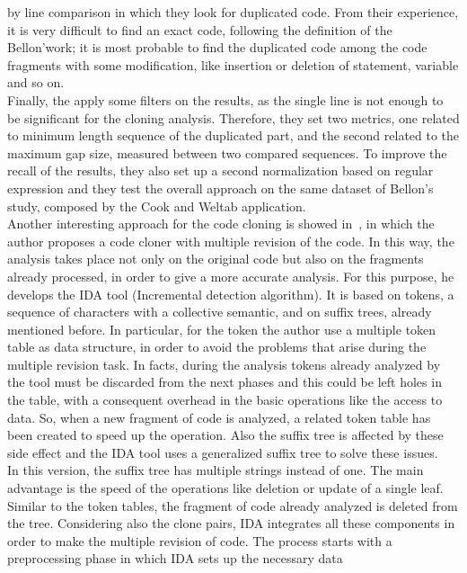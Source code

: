 by line comparison in which they look for duplicated code. From their 
experience, it is very difficult to find an exact code, following the 
definition of the Bellon'work; it is most probable to find the duplicated code 
among the code fragments with some modification, like insertion or deletion of 
statement, variable and so on. \\
Finally, the apply some filters on the results, as the single line is not 
enough to be significant for the cloning analysis. Therefore, they set two 
metrics, one related to minimum length sequence of the duplicated part, and the 
second related to the maximum gap size, measured between two compared 
sequences. To improve the recall of the results, they also set up a second 
normalization based on regular expression and they test the overall approach on 
the same dataset of Bellon's study, composed by the Cook and Weltab 
application. 
\\
Another interesting approach for the code cloning is showed 
in~\cite{nils_gode_incremental_2008}, in which the author proposes a code 
cloner with multiple revision of the code. In this way, the analysis takes 
place not only on the original code but also on the fragments already 
processed, in order to give a more accurate analysis. For this purpose, he 
develops the IDA tool (Incremental detection algorithm). It is based on tokens, 
a sequence of characters with a collective semantic, and on suffix trees, 
already mentioned before. In particular, for the token the author use a 
multiple token table as data structure, in order to avoid the problems that 
arise during the multiple revision task. In facts, during the analysis tokens 
already analyzed by the tool must be discarded from the next phases and this 
could be left holes in the table, with a consequent overhead in the basic 
operations like the access to data. So, when a new fragment of code is 
analyzed, a related token table has been created to speed up the operation. 
Also the suffix tree is affected by these side effect and the IDA tool uses a 
generalized suffix tree to solve these issues. \\
\newpage
In this version, the suffix tree has multiple strings instead of one. The main 
advantage is the speed of the operations like deletion or update of a single 
leaf. Similar to the token tables, the fragment of code already analyzed is 
deleted from the tree. Considering also the clone pairs, IDA integrates all 
these components in order to make the multiple revision of code. The process 
starts with a preprocessing phase in which IDA sets up the necessary data 

